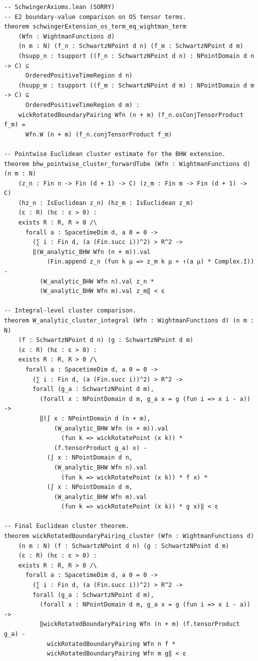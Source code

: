 \documentclass[11pt,a4paper]{article}
\begin{document}
\begin{lstlisting}[style=leansorry]
-- SchwingerAxioms.lean (SORRY)
-- E2 boundary-value comparison on OS tensor terms.
theorem schwingerExtension_os_term_eq_wightman_term
    (Wfn : WightmanFunctions d)
    (n m : N) (f_n : SchwartzNPoint d n) (f_m : SchwartzNPoint d m)
    (hsupp_n : tsupport ((f_n : SchwartzNPoint d n) : NPointDomain d n -> C) ⊆
      OrderedPositiveTimeRegion d n)
    (hsupp_m : tsupport ((f_m : SchwartzNPoint d m) : NPointDomain d m -> C) ⊆
      OrderedPositiveTimeRegion d m) :
    wickRotatedBoundaryPairing Wfn (n + m) (f_n.osConjTensorProduct f_m) =
      Wfn.W (n + m) (f_n.conjTensorProduct f_m)

-- Pointwise Euclidean cluster estimate for the BHW extension.
theorem bhw_pointwise_cluster_forwardTube (Wfn : WightmanFunctions d) (n m : N)
    (z_n : Fin n -> Fin (d + 1) -> C) (z_m : Fin m -> Fin (d + 1) -> C)
    (hz_n : IsEuclidean z_n) (hz_m : IsEuclidean z_m)
    (ε : R) (hε : ε > 0) :
    exists R : R, R > 0 /\
      forall a : SpacetimeDim d, a 0 = 0 ->
        (∑ i : Fin d, (a (Fin.succ i))^2) > R^2 ->
        ‖(W_analytic_BHW Wfn (n + m)).val
            (Fin.append z_n (fun k μ => z_m k μ + ↑(a μ) * Complex.I)) -
          (W_analytic_BHW Wfn n).val z_n *
          (W_analytic_BHW Wfn m).val z_m‖ < ε

-- Integral-level cluster comparison.
theorem W_analytic_cluster_integral (Wfn : WightmanFunctions d) (n m : N)
    (f : SchwartzNPoint d n) (g : SchwartzNPoint d m)
    (ε : R) (hε : ε > 0) :
    exists R : R, R > 0 /\
      forall a : SpacetimeDim d, a 0 = 0 ->
        (∑ i : Fin d, (a (Fin.succ i))^2) > R^2 ->
        forall (g_a : SchwartzNPoint d m),
          (forall x : NPointDomain d m, g_a x = g (fun i => x i - a)) ->
          ‖(∫ x : NPointDomain d (n + m),
              (W_analytic_BHW Wfn (n + m)).val
                (fun k => wickRotatePoint (x k)) *
              (f.tensorProduct g_a) x) -
            (∫ x : NPointDomain d n,
              (W_analytic_BHW Wfn n).val
                (fun k => wickRotatePoint (x k)) * f x) *
            (∫ x : NPointDomain d m,
              (W_analytic_BHW Wfn m).val
                (fun k => wickRotatePoint (x k)) * g x)‖ < ε

-- Final Euclidean cluster theorem.
theorem wickRotatedBoundaryPairing_cluster (Wfn : WightmanFunctions d)
    (n m : N) (f : SchwartzNPoint d n) (g : SchwartzNPoint d m)
    (ε : R) (hε : ε > 0) :
    exists R : R, R > 0 /\
      forall a : SpacetimeDim d, a 0 = 0 ->
        (∑ i : Fin d, (a (Fin.succ i))^2) > R^2 ->
        forall (g_a : SchwartzNPoint d m),
          (forall x : NPointDomain d m, g_a x = g (fun i => x i - a)) ->
          ‖wickRotatedBoundaryPairing Wfn (n + m) (f.tensorProduct g_a) -
            wickRotatedBoundaryPairing Wfn n f *
            wickRotatedBoundaryPairing Wfn m g‖ < ε


\end{lstlisting}
\end{document}
